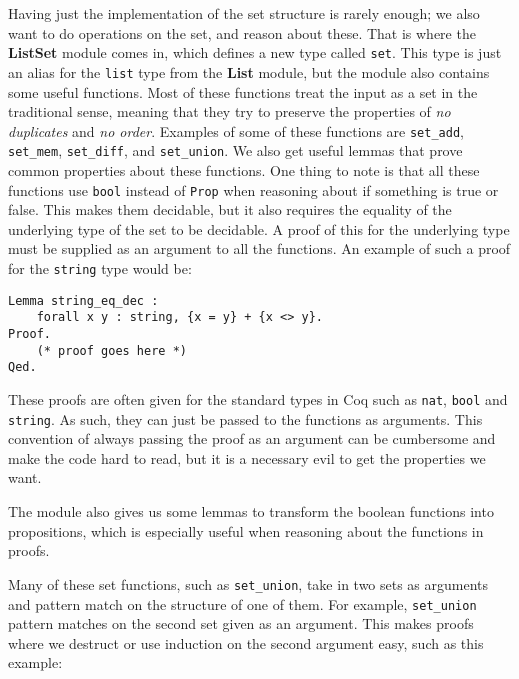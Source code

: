 Having just the implementation of the set structure is rarely enough; we also want to do operations on the set, and reason about these.
That is where the \textbf{ListSet} module comes in, which defines a new type called \lstinline{set}.
This type is just an alias for the \lstinline{list} type from the \textbf{List} module,
but the module also contains some useful functions.
Most of these functions treat the input as a set in the traditional sense,
meaning that they try to preserve the properties of \textit{no duplicates} and \textit{no order}.
Examples of some of these functions are \lstinline{set_add}, \lstinline{set_mem},
\lstinline{set_diff}, and \lstinline{set_union}.
We also get useful lemmas that prove common properties about these functions.
One thing to note is that all these functions use \lstinline{bool} instead of
\lstinline{Prop} when reasoning about if something is true or false.
This makes them decidable, but it also requires the equality of the underlying type of the set to be decidable.
A proof of this for the underlying type must be supplied as an argument to all the functions.
An example of such a proof for the \lstinline{string} type would be:

\begin{minipage}{\linewidth}
\begin{lstlisting}[language=Coq, label={lst:string_eq_dec}, caption={Decidability proof for string equality in Coq}]
Lemma string_eq_dec :
    forall x y : string, {x = y} + {x <> y}.
Proof.
    (* proof goes here *)
Qed.
\end{lstlisting}
\end{minipage}

These proofs are often given for the standard types in Coq such as \lstinline{nat},
\lstinline{bool} and \lstinline{string}.
As such, they can just be passed to the functions as arguments.
This convention of always passing the proof as an argument can be cumbersome and make the code hard to read,
but it is a necessary evil to get the properties we want.

The module also gives us some lemmas to transform the boolean functions into propositions,
which is especially useful when reasoning about the functions in proofs.

Many of these set functions, such as \lstinline{set_union},
take in two sets as arguments and pattern match on the structure of one of them.
For example, \lstinline{set_union} pattern matches on the second set given as an argument.
This makes proofs where we destruct or use induction on the second argument easy, such as this example:

